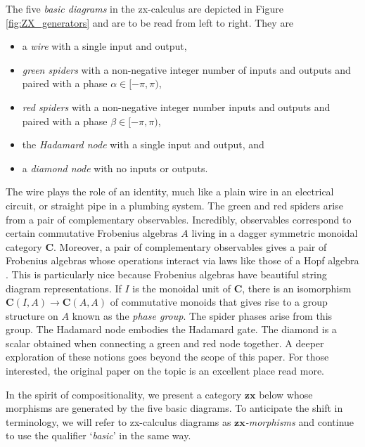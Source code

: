 The five \emph{basic diagrams} 
in the zx-calculus are depicted 
in Figure \ref{fig:ZX_generators}
and are to be read from left to right. 
They are
\begin{itemize}
	\item a \emph{wire} with 
		a single input and output,
	\item \emph{green spiders} with 
		a non-negative integer number of 
		inputs and outputs and 
		paired with a phase $\alpha \in [-\pi,\pi)$,
	\item \emph{red spiders} with 
		a non-negative integer number 
		inputs and outputs and 
		paired with a phase $\beta \in [-\pi,\pi)$,
	\item the \emph{Hadamard node} with
		 a single input and output, and
	\item a \emph{diamond node} with 
		no inputs or outputs.
\end{itemize}
The wire plays the role 
of an identity, much like a 
plain wire in an electrical circuit, 
or straight pipe in a plumbing system. 
The green and red spiders 
arise from a pair of 
complementary observables.  
Incredibly, observables 
correspond to certain 
commutative Frobenius algebras $A$ 
living in a 
dagger symmetric monoidal category 
	$\mathbf{C}$. 
Moreover, a pair of 
complementary observables gives a 
pair of Frobenius algebras whose 
operations interact via laws like 
those of a Hopf algebra 
	\cite{CoeckePavlovic_QuanMeasSums, 
		CoeckePavVicary_OrthogBases}.  
This is particularly nice because 
Frobenius algebras have 
beautiful string diagram representations. 
If $I$ is the monoidal unit of $\mathbf{C}$, 
there is an isomorphism 
	$\mathbf{C}(I,A) \to \mathbf{C}(A,A)$ 
of commutative monoids 
that gives rise to a 
group structure on $A$ 
known as the \emph{phase group}.  
The spider phases arise from this group.
The Hadamard node embodies 
the Hadamard gate. 
The diamond is a scalar obtained when
connecting a green and red node together.  
A deeper exploration of these notions 
goes beyond the scope of this paper.  
For those interested, 
the original paper on the topic
	\cite{CoeckeDuncan_QuantumObsFullPaper}
is an excellent place read more.

In the spirit of compositionality, 
we present a category 
$\mathbf{zx}$ below 
whose morphisms are 
generated by the 
five basic diagrams. 
To anticipate the shift
in terminology, we will
refer to zx-calculus diagrams
as \emph{$\mathbf{zx}$-morphisms} 
and continue to use the
qualifier `\emph{basic}' in the 
same way.

